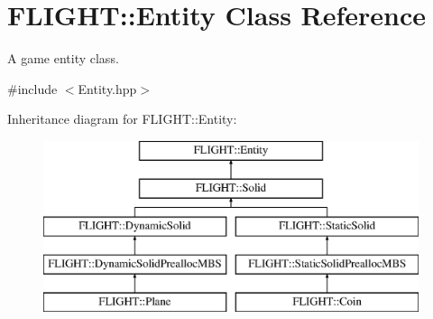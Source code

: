 \hypertarget{class_f_l_i_g_h_t_1_1_entity}{}\section{F\+L\+I\+G\+HT\+:\+:Entity Class Reference}
\label{class_f_l_i_g_h_t_1_1_entity}


A game entity class.  




{\ttfamily \#include $<$Entity.\+hpp$>$}

Inheritance diagram for F\+L\+I\+G\+HT\+:\+:Entity\+:\begin{figure}[H]
\begin{center}
\leavevmode
\includegraphics[height=5.000000cm]{class_f_l_i_g_h_t_1_1_entity}
\end{center}
\end{figure}
